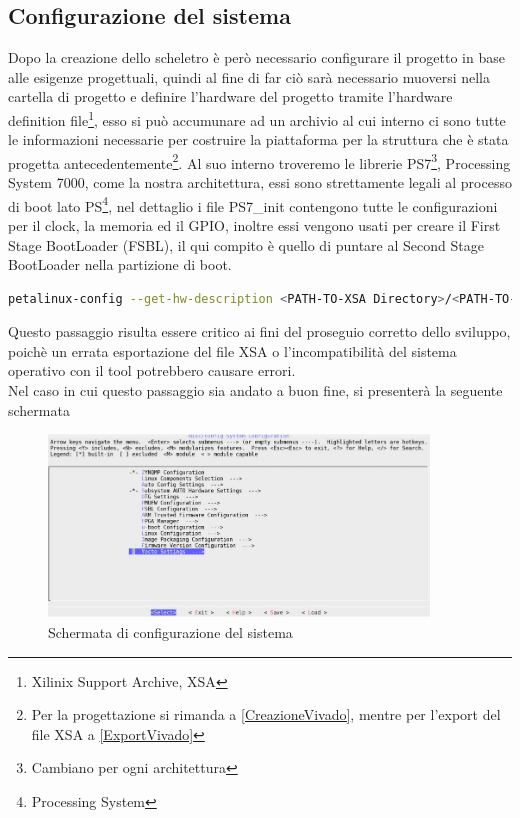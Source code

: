 \subsection{Configurazione del sistema}
Dopo la creazione dello scheletro è però necessario configurare il progetto in base alle esigenze progettuali, quindi al fine di far ciò sarà necessario muoversi nella cartella di progetto e definire l'hardware del progetto tramite l'hardware definition file\footnote{Xilinix Support Archive, XSA},  esso si può accumunare ad un archivio al cui interno ci sono tutte le informazioni necessarie per costruire la piattaforma per la struttura che è stata progetta antecedentemente\footnote{Per la progettazione si rimanda a \ref{CreazioneVivado}, mentre per l'export del file XSA a \ref{ExportVivado}}. Al suo interno troveremo le librerie PS7\footnote{Cambiano per ogni architettura}, Processing System 7000, come la nostra architettura, essi sono strettamente legali al processo di boot lato PS\footnote{Processing System}, nel dettaglio i file PS7\_init contengono tutte le configurazioni per il clock, la memoria ed il GPIO, inoltre essi vengono usati per creare il First Stage BootLoader (FSBL), il qui compito è quello di puntare al Second Stage BootLoader nella partizione di boot. 
\begin{lstlisting}[language=sh, label=lst:sh, caption={Comando necessario alla definizione dell'hardware}]
petalinux-config --get-hw-description <PATH-TO-XSA Directory>/<PATH-TO-XSA>
\end{lstlisting}
Questo passaggio risulta essere critico ai fini del proseguio corretto dello sviluppo, poichè un errata esportazione del file XSA o l'incompatibilità del sistema operativo con il tool potrebbero causare errori.\\
Nel caso in cui questo passaggio sia andato a buon fine, si presenterà la seguente schermata
\begin{figure}[h]
\centering
\includegraphics[width=0.9\textwidth]{images/image1.jpg}
\caption{Schermata di configurazione del sistema}
\end{figure}
